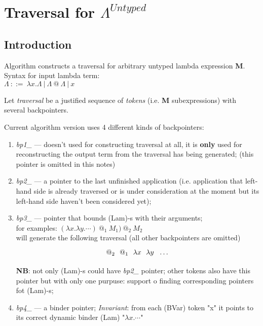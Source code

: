 \documentclass[a4paper, 10pt]{article}
\newcommand{\tikzmark}[3][]{\tikz[remember picture,baseline] \node [inner xsep=0pt,anchor=base,#1](#2) {#3};}
\begin{document}
\tableofcontents
\newpage

\section{Traversal for $\Lambda^{Untyped}$}

\subsection{Introduction}
Algorithm constructs a traversal for arbitrary untyped lambda expression \textbf{M}.\\
Syntax for input lambda term:\\
$\Lambda\ ::=\ \lambda x . \Lambda\ |\ \Lambda\ @\ \Lambda\ |\ x$

Let \textit{traversal} be a 
justified sequence of \textit{tokens} (i.e. \textbf{M} subexpressions) with several backpointers.

Current algorithm version uses 4 different kinds of backpointers:
\begin{enumerate}
\item \textit{bp1\_} --- doesn't used for constructing traversal at all, it is \textbf{only} used for reconstructing the output term from the traversal has being generated; (this pointer is omitted in this notes)
\item \textit{bp2\_} --- a pointer to the last unfinished application (i.e. application that left-hand side is already traversed or is under consideration at the moment but its left-hand side haven't been considered yet);
\item \textit{bp3\_} --- pointer that bounds (Lam)-s with their arguments;\\
for examples: $(\lambda x . \lambda y . \cdots)\ @_1\ M_1)\ @_2\ M_2$\\will generate the following traversal (all other backpointers are omitted)
\[\tikzmark{1}{$@_2$}\ \ \tikzmark{2}{$@_1$}\ \ \tikzmark{3}{$\lambda x$}\ \ \tikzmark{4}{$\lambda y$}\ \ \dots \]
\textbf{NB}: not only (Lam)-s could have \textit{bp2\_} pointer; other tokens also have this pointer but with only one purpuse: support o finding corresponding pointers fot (Lam)-s;
\item \textit{bp4\_} --- a binder pointer; \textit{Invariant}: from each (BVar) token "x" it points to its correct dynamic binder (Lam) "$\lambda x . \cdots$"
\end{enumerate}
\end{document}
